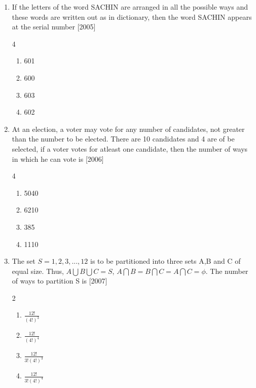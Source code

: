 \documentclass[journal,12pt,twocolumn]{IEEEtran}
\theoremstyle{remark}
\begin{document}
\begin{enumerate}
	\begin{multicols}{4}
		\begin{enumerate}
     \item $ 8\choose3$
     \item 21
     \item $3^8$
     \item 5
 \end{enumerate}
	\end{multicols}
\item If the letters of the word SACHIN are arranged in all the possible ways and these words are written out as in dictionary, then the word SACHIN appears at the serial number \hfill[2005]
	\begin{multicols}{4}
		\begin{enumerate}
     \item 601
     \item 600
     \item 603
     \item 602
 \end{enumerate}
	\end{multicols}
\item At an election, a voter may vote for any number of candidates, not greater than the number to be elected. There are 10 candidates and 4 are of be selected, if a voter votes for atleast one candidate, then the number of ways in which he can vote is \hfill[2006]
	\begin{multicols}{4}
        \begin{enumerate}
 \item 5040
 \item 6210
 \item 385
 \item 1110
        \end{enumerate}
	\end{multicols}
\item The set $S={1,2,3,...,12}$ is to be partitioned into three sets A,B and C of equal size. Thus, $A\bigcup B\bigcup C=S$, $A \bigcap B=B \bigcap  C =A \bigcap C=\phi$. The number of ways to partition S is \hfill[2007]
	\begin{multicols}{2}
	\begin{enumerate}
     \item $ \frac{12!}{(4!)^3}$
     \item $\frac{12!}{(4!)^4}$
     \item $\frac{12!}{3!(4!)^3}$
     \item $\frac{12!}{3!(4!)^4}$
        \end{enumerate}

\end{multicols}
\end{enumerate}
\end{document}
